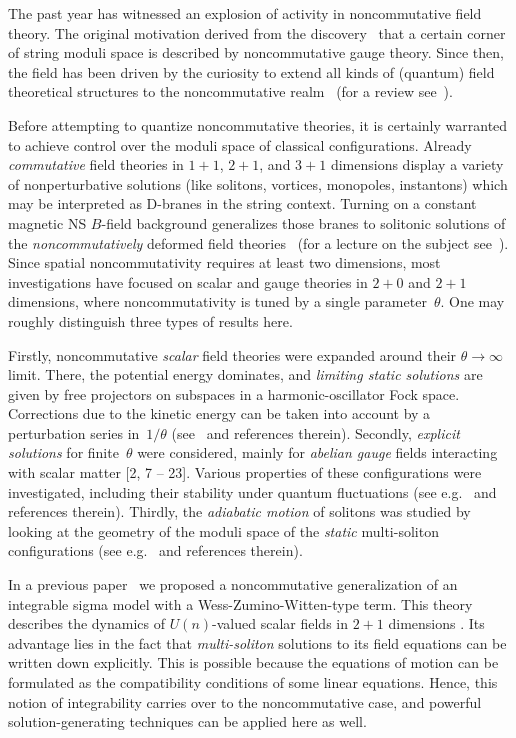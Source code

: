 \documentclass[a4paper,11pt]{article}
\numberwithin{equation}{section}
\def\th{\theta}
\begin{document}
\noindent
The past year has witnessed an explosion of activity in noncommutative
field theory. The original motivation derived from the discovery~\cite{seiberg}
that a certain corner of string moduli space is described by noncommutative
gauge theory. Since then, the field has been driven by the curiosity
to extend all kinds of (quantum) field theoretical structures to the
noncommutative realm~\cite{gopa} (for a review see~\cite{douglas}).

Before attempting to quantize noncommutative theories, it is certainly
warranted to achieve control over the moduli space of classical configurations.
Already {\it commutative\/} field theories in $1{+}1$, $2{+}1$, and $3{+}1$
dimensions display a variety of nonperturbative solutions (like solitons,
vortices, monopoles, instantons) which may be interpreted as D-branes in the
string context. Turning on a constant magnetic NS $B$-field background
generalizes those branes to solitonic solutions of the {\it noncommutatively\/}
deformed field theories~\cite{dasgupta,martinec} (for a lecture on the subject
see~\cite{komaba}).
Since spatial noncommutativity requires at least two dimensions, most
investigations have focused on scalar and gauge theories in $2{+}0$ and $2{+}1$
dimensions, where noncommutativity is tuned by a single parameter~$\th$.
One may roughly distinguish three types of results here.

Firstly, noncommutative {\it scalar\/} field theories were expanded around
their $\th{\to}\infty$ limit. There, the potential energy dominates, and
{\it limiting static solutions\/} are given by free projectors on subspaces
in a harmonic-oscillator Fock space. Corrections due to the kinetic energy can
be taken into account by a perturbation series in~$1/\th$
(see~\cite{gopa,jatkar,gopa2,rocek} and references therein).
Secondly, {\it explicit solutions\/} for finite~$\th$ were considered,
mainly for {\it abelian gauge\/} fields interacting with scalar matter
[2, 7 -- 23].  %
Various properties of these configurations were investigated, including
their stability under quantum fluctuations
(see e.g.~\cite{aga,gross3,jackson} and references therein).
Thirdly, the {\it adiabatic motion\/} of solitons was studied by looking
at the geometry of the moduli space of the {\it static\/} multi-soliton
configurations (see e.g.~\cite{gopa2,rocek,araki} and references therein).

In a previous paper~\cite{LPS2} we proposed a noncommutative generalization
of an integrable sigma model with a Wess-Zumino-Witten-type term. This theory
describes the dynamics of $U(n)$-valued scalar fields in $2{+}1$ dimensions
\cite{ward}.
Its advantage lies in the fact that {\it multi-soliton\/} solutions to
its field equations can be written down explicitly.
This is possible because the equations of motion can be formulated as
the compatibility conditions of some linear equations.
Hence, this notion of integrability carries over to the noncommutative case,
and powerful solution-generating techniques can be applied here as well.
\end{document}
